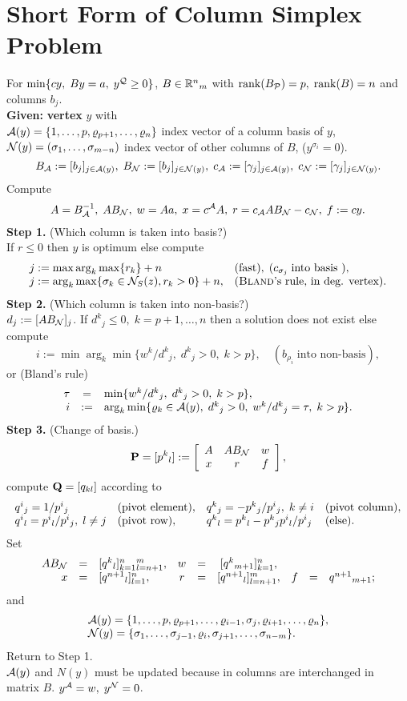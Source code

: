 \section{Short Form of Column Simplex Problem}
For $\min \{cy, \; By = a, \; y^{\Q} \geq 0\}$, $B
\in \Bbb{R}^n{}_m$ with $\rank (B_{\P}) = p, \; \rank (B) = n$ and
columns $b_j$.\\
%
{\bf Given:} {\bf vertex} $y$ with\\
$\A(y) = \{1, \ldots, p, \rho _{p+1}, \ldots , \rho _n\}$ index vector of a
column basis of $y$,\\
$\N(y) = (\sigma  _1, \ldots , \sigma _{m-n})$ index vector of other
columns of $B$, ($y^{\sigma  _i} = 0$).
\[
B_{\A} := [b_j]_{j \in \A(y)}, \; B_{\N} := [b_j]_{j \in \N(y)}, \;
c_{\A} := [\gamma _j]_{j \in \A(y)}, \; c_{\N} := [\gamma _j]_{j \in
\N(y)}.
\]
%
Compute
\[
A = B_{\A}^{-1}, \; AB_{\N}, \; w = Aa, \;
x = c^{\A}A, \; r = c_{\A}AB_{\N} - c_{\N}, \;  f := cy.
\]
{\bf Step 1.} (Which column is taken into basis?)\\
If $r \leq 0$ then $y$ is optimum else compute
\[ \ba{.}{ll}
j:= \max \arg_k \max  \{r_k \} + n & \mbox{(fast)}, \;
(c_{\sigma  _j} \;\mbox{into basis }),\\
j := \arg_k \max \{\sigma _k \in \N_S(z), r_k > 0\} + n, &
\mbox{({\sc Bland}'s rule, in deg. vertex)}.\\
\ea{.}
\]
{\bf Step 2.} (Which column is taken into non-basis?)\\
$d_j := [AB_{\N}]_j$. If $d^k{}_j \leq 0, \; k = p+1, \ldots , n$ then a
solution does not exist else compute
\[
i := \min \arg_k \min \{w^k/d^k{}_j, \; d^k{}_j > 0, \; k > p\},
 \quad (b_{\rho _i}\;\mbox{into non-basis}),
\]
or ({\sc Bland}'s rule)
\[
\ba{.}{rcl}
 \tau  &=& \min\{w^k/d^k{}_j, \; d^k{}_j > 0, \; k > p\},\\
i &:=&  \arg_k \min  \{\rho  _k \in \A(y), \; d^k{}_j > 0, \;
w^k/d^k{}_j = \tau, \; k > p\}. \ea{.}
\]
{\bf Step 3.} (Change of basis.)
\[
{\bf P} = [p^k{}_l] := \ba{[}{ccc}
A & AB_{\N} & w \\
x & r &f \\
\ea{]},
\]
compute ${\bf Q} = [q_{kl}]$ according to
\[ \ba{.}{llll}
q^i{}_j = 1/p^i{}_j            & \mbox{(pivot element)}, &
q^k{}_j = - p^k{}_j/p^i{}_j, \; k \neq i &\mbox{(pivot column)},\\
%
q^i{}_l = p^i{}_l/p^i{}_j,\; l \neq j
& \mbox{(pivot row)}, &q^k{}_l = p^k{}_l - p^k{}_j
p^i{}_l/p^i{}_j & \mbox{(else)}.
\ea{.}
\]
Set
\[ \ba{.}{rclcrclcrcl}
AB_{\N} &=& [q^k{}_l]_{k = 1}^n{}_{l=n+1}^m,
&w &=&  [q^k{}_{m+1}]_{k=1}^n,\\
x &=& [q^{n+1}{}_l]_{l=1}^n, &  r &=& [q^{n + 1}{}_l]_{l=n+1}^m, &f &=&
q^{n+1}{}_{m+1}; \ea{.}
\]
and
\[ \ba{.}{l}
\A(y) = \{1, \ldots,p, \rho  _{p+1} , \ldots , \rho _{i - 1},
           \sigma  _j ,\rho  _{i+1}, \ldots , \rho _n\},\\
\N(y)   = \{\sigma _1 , \ldots , \sigma _{j - 1},
           \rho _i,\sigma _{j+1}, \ldots , \sigma _{n-m}\}.
\ea{.}
\]
Return to Step 1.\\
$\A(y)$ and $N(y)$ must be updated because in columns are
interchanged in matrix $B$. $y^{\A} = w, \; y^{\N} = 0$.

